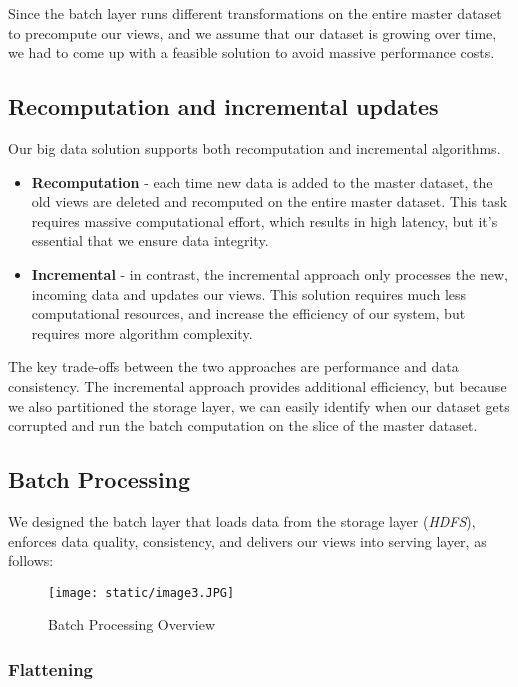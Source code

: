 \documentclass[format=acmsmall, review=false, screen=true]{acmart}
\begin{document}
Since the batch layer runs different transformations on the entire master dataset to precompute our views, and we assume that our dataset is growing over time, we had to come up with a feasible solution to avoid massive performance costs.

\subsection{Recomputation and incremental updates}

Our big data solution supports both recomputation and incremental algorithms.

\begin{itemize}
		\item \textbf{Recomputation} - each time new data is added to the master dataset, the old views are deleted and recomputed on the entire master dataset. This task requires massive computational effort, which results in high latency, but it's essential that we ensure data integrity.
		\item \textbf{Incremental} - in contrast, the incremental approach only processes the new, incoming data and updates our views. This solution requires much less computational resources, and increase the efficiency of our system, but requires more algorithm complexity.
\end{itemize}

The key trade-offs between the two approaches are performance and data consistency. The incremental approach provides additional efficiency, but because we also partitioned the storage layer, we can easily identify when our dataset gets corrupted and run the batch computation on the slice of the master dataset.

\subsection{Batch Processing}

We designed the batch layer that loads data from the storage layer (\textit{HDFS}), enforces data quality, consistency, and delivers our views into serving layer, as follows:

\begin{figure}[H]
  \texttt{[image: static/image3.JPG]}
  \caption{Batch Processing Overview}
  \label{fig:verticalpartitioning-diagram}
\end{figure}

\subsubsection{Flattening}
\end{document}
